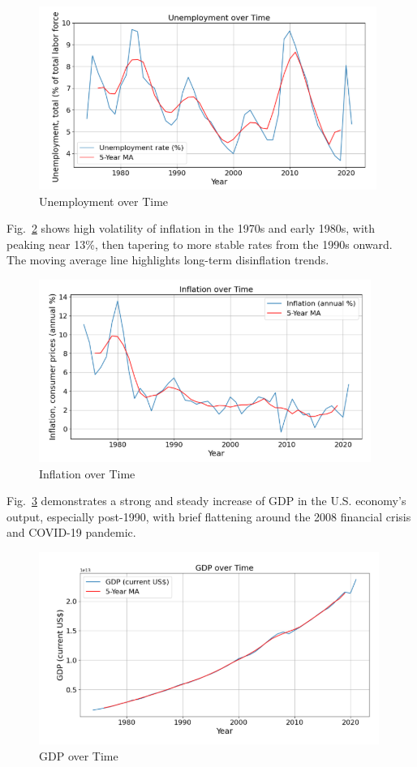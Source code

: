 \documentclass[conference]{IEEEtran}
\begin{document}
\begin{figure}[H]
    \centering
    \includegraphics[width=0.9\linewidth]{unemployment.png}
    \caption{Unemployment over Time}
    \label{fig:unemployment}
\end{figure}

Fig.~\ref{fig:inflation} shows high volatility of inflation in the 1970s and early 1980s, with peaking near 13\%, then tapering to more stable rates from the 1990s onward. The moving average line highlights long-term disinflation trends.

\begin{figure}[htbp]
    \centering
    \includegraphics[width=0.9\linewidth]{inflation.png}
    \caption{Inflation over Time}
    \label{fig:inflation}
\end{figure}

Fig.~\ref{fig:gdp_total} demonstrates a strong and steady increase of GDP in the U.S. economy's output, especially post-1990, with brief flattening around the 2008 financial crisis and COVID-19 pandemic.

\begin{figure}[htbp]
    \centering
    \includegraphics[width=0.9\linewidth]{gdp_total.png}
    \caption{GDP over Time}
    \label{fig:gdp_total}
\end{figure}
\end{document}
